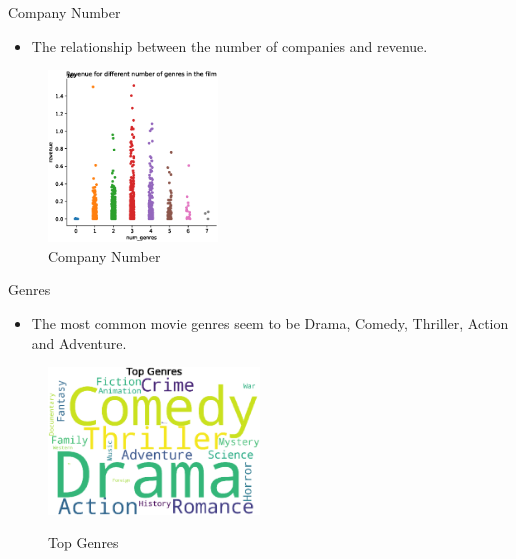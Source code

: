 \documentclass[
 size=14pt,
 paper=smartboard,  %
 mode=present, 		%
 display=slides, 	%
 style=tuliplab,  	%
 pauseslide,
 fleqn,leqno]{powerdot}
\begin{document}
\begin{slide}{Company Number}
  \begin{itemize}
    \item The relationship between the number of companies and revenue.
  \end{itemize}
  \begin{figure}[htbp]
    \centering
    \includegraphics[width=0.4\textwidth]{figures//counrty.eps}
    \caption{Company Number}
  \end{figure}
\end{slide}




\begin{slide}{Genres}
  \begin{itemize}
    \item The most common movie genres seem to be Drama, Comedy, Thriller, Action and Adventure.
  \end{itemize}
  \begin{figure}[htbp]
    \centering
    \includegraphics[width=0.5\textwidth]{figures//genre_clold.eps}\\
    \caption{Top Genres}
  \end{figure}
\end{slide}
\end{document}
